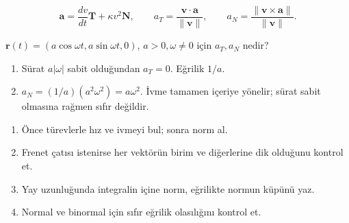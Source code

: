 {\small\[
\mathbf a=\frac{dv}{dt}\mathbf T+\kappa v^2\mathbf N,\qquad a_T=\frac{\mathbf v\cdot\mathbf a}{\|\mathbf v\|},\qquad a_N=\frac{\|\mathbf v\times\mathbf a\|}{\|\mathbf v\|}.
\]}
\begin{tcolorbox}[title={Örnek 3.23 | Dairesel harekette ivme},colframe=accent]\(\mathbf r(t)=(a\cos\omega t,a\sin\omega t,0)\), \(a>0,\omega\ne0\) için \(a_T,a_N\) nedir?
\par\vspace{1mm}{\scriptsize\sffamily Pekiştirme}\end{tcolorbox}
\begin{tcolorbox}[title={Adım adım çözüm},colback=green!3!white,colframe=green]\begin{enumerate}
\item Sürat \(a|\omega|\) sabit olduğundan \(a_T=0\). Eğrilik \(1/a\).
\item \(a_N=(1/a)(a^2\omega^2)=a\omega^2\). İvme tamamen içeriye yönelir; sürat sabit olmasına rağmen sıfır değildir.
\end{enumerate}\end{tcolorbox}
\begin{enumerate}
\item Önce türevlerle hız ve ivmeyi bul; sonra norm al.
\item Frenet çatısı istenirse her vektörün birim ve diğerlerine dik olduğunu kontrol et.
\item Yay uzunluğunda integralin içine norm, eğrilikte normun küpünü yaz.
\item Normal ve binormal için sıfır eğrilik olasılığını kontrol et.
\end{enumerate}

\clearpage
